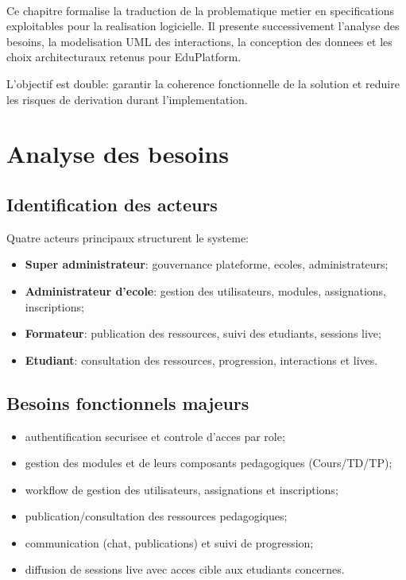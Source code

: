 ﻿﻿\documentclass[12pt,a4paper,oneside]{report}
\begin{document}
Ce chapitre formalise la traduction de la problematique metier en specifications exploitables pour la realisation logicielle. Il presente successivement l'analyse des besoins, la modelisation UML des interactions, la conception des donnees et les choix architecturaux retenus pour EduPlatform.

L'objectif est double: garantir la coherence fonctionnelle de la solution et reduire les risques de derivation durant l'implementation.

\section{Analyse des besoins}

\subsection{Identification des acteurs}

Quatre acteurs principaux structurent le systeme:
\begin{itemize}
  \item \textbf{Super administrateur}: gouvernance plateforme, ecoles, administrateurs;
  \item \textbf{Administrateur d'ecole}: gestion des utilisateurs, modules, assignations, inscriptions;
  \item \textbf{Formateur}: publication des ressources, suivi des etudiants, sessions live;
  \item \textbf{Etudiant}: consultation des ressources, progression, interactions et lives.
\end{itemize}

\subsection{Besoins fonctionnels majeurs}

\begin{itemize}
  \item authentification securisee et controle d'acces par role;
  \item gestion des modules et de leurs composants pedagogiques (Cours/TD/TP);
  \item workflow de gestion des utilisateurs, assignations et inscriptions;
  \item publication/consultation des ressources pedagogiques;
  \item communication (chat, publications) et suivi de progression;
  \item diffusion de sessions live avec acces cible aux etudiants concernes.
\end{itemize}
\end{document}
